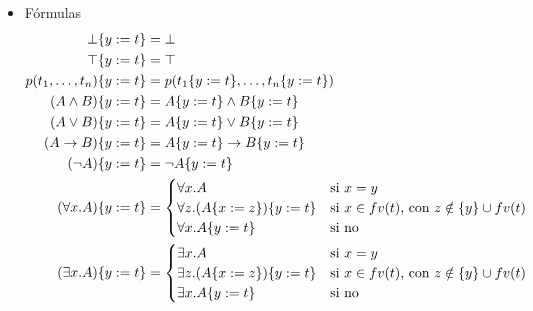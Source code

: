 \begin{definition}
\begin{itemize}
        \item Fórmulas
        \begin{align*}    
            \bot\{y := t\} &= \bot\\
            \top\{y := t\} &= \top\\
            p(t_1, \dots, t_n)\{y := t\} &=
            p(
                    t_1\{y := t\},
                    \dots,
                    t_n\{y := t\}
                )
            \\
            (A \wedge B)\{y := t\} &= 
                A\{y := t\} \wedge B\{y := t\}\\
            (A \vee B)\{y := t\} &=
            A\{y := t\} \vee B\{y := t\}\\
            (A \to B)\{y := t\} &=
            A\{y := t\} \to B\{y := t\}\\
            (\neg A)\{y := t\} &=
                \neg A\{y := t\}\\
            (\forall x . A)\{y := t\} &=
            \begin{cases}
                \forall x . A
                    &\text{si } x = y\\
                \forall z . (A\{x := z\})\{y := t\}
                    &\text{si } x \in fv(t) \text{, con } z \notin \{y\} \cup fv(t)\\
                \forall x . A\{y := t\}
                    &\text{si no}
            \end{cases}
            \\
            (\exists x . A)\{y := t\} &=
            \begin{cases}
                \exists x . A
                    &\text{si } x = y\\
                \exists z . (A\{x := z\})\{y := t\}
                    &\text{si } x \in fv(t) \text{, con } z \notin \{y\} \cup fv(t)\\
                \exists x . A\{y := t\}
                    &\text{si no}
            \end{cases}
        \end{align*}

    \end{itemize}
\end{definition}

